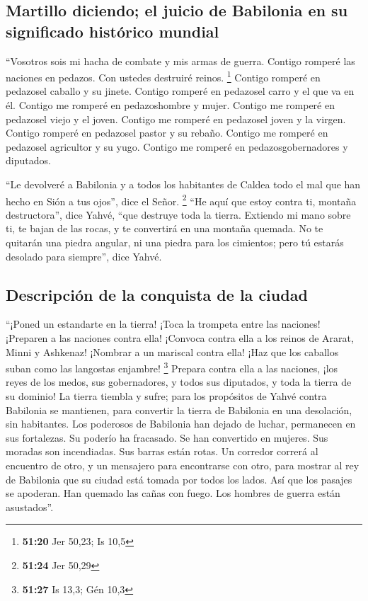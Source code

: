 \begin{paracol}{2}
{\subsection{Martillo diciendo; el juicio de Babilonia en su significado
histórico
mundial}\label{martillo-diciendo-el-juicio-de-babilonia-en-su-significado-histuxf3rico-mundial}}

 ``Vosotros sois mi hacha de combate y mis armas de
guerra. Contigo romperé las naciones en pedazos. Con ustedes destruiré
reinos. \footnote{\textbf{51:20} Jer 50,23; Is 10,5} 
Contigo romperé en pedazosel caballo y su jinete. 
Contigo romperé en pedazosel carro y el que va en él. Contigo me romperé
en pedazoshombre y mujer. Contigo me romperé en pedazosel viejo y el
joven. Contigo me romperé en pedazosel joven y la virgen.
 Contigo romperé en pedazosel pastor y su rebaño. Contigo
me romperé en pedazosel agricultor y su yugo. Contigo me romperé en
pedazosgobernadores y diputados.

 ``Le devolveré a Babilonia y a todos los habitantes de
Caldea todo el mal que han hecho en Sión a tus ojos'', dice el Señor.
\footnote{\textbf{51:24} Jer 50,29}  ``He aquí que estoy
contra ti, montaña destructora'', dice Yahvé, ``que destruye toda la
tierra. Extiendo mi mano sobre ti, te bajan de las rocas, y te
convertirá en una montaña quemada.  No te quitarán una
piedra angular, ni una piedra para los cimientos; pero tú estarás
desolado para siempre'', dice Yahvé.

\hypertarget{descripciuxf3n-de-la-conquista-de-la-ciudad}{%
\subsection{Descripción de la conquista de la
ciudad}\label{descripciuxf3n-de-la-conquista-de-la-ciudad}}

 ``¡Poned un estandarte en la tierra! ¡Toca la trompeta
entre las naciones! ¡Preparen a las naciones contra ella! ¡Convoca
contra ella a los reinos de Ararat, Minni y Ashkenaz! ¡Nombrar a un
mariscal contra ella! ¡Haz que los caballos suban como las langostas
enjambre! \footnote{\textbf{51:27} Is 13,3; Gén 10,3} 
Prepara contra ella a las naciones, ¡los reyes de los medos, sus
gobernadores, y todos sus diputados, y toda la tierra de su dominio!
 La tierra tiembla y sufre; para los propósitos de Yahvé
contra Babilonia se mantienen, para convertir la tierra de Babilonia en
una desolación, sin habitantes.  Los poderosos de
Babilonia han dejado de luchar, permanecen en sus fortalezas. Su poderío
ha fracasado. Se han convertido en mujeres. Sus moradas son incendiadas.
Sus barras están rotas.  Un corredor correrá al encuentro
de otro, y un mensajero para encontrarse con otro, para mostrar al rey
de Babilonia que su ciudad está tomada por todos los lados.
 Así que los pasajes se apoderan. Han quemado las cañas
con fuego. Los hombres de guerra están asustados''.


\end{paracol}
